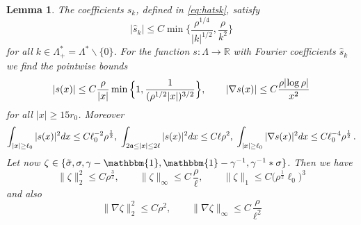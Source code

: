 \documentclass[a4paper,11pt]{article}
\def\bR{\mathbb{R}}
\let\io=\infty
\newtheorem{lemma}[theorem]{Lemma}
\numberwithin{equation}{section}
\begin{document}
\begin{lemma} \label{lm:eta}
The coefficients $\widehat{s}_k$, defined in \eqref{eq:hatsk}, satisfy 
\begin{equation} \label{eq:sfourier} |\widehat{s}_k| \leq C \min \Big\{  \frac{\rho^{1/4}}{|k|^{1/2}} , \frac{\rho}{k^2} \Big\} \end{equation} 
for all $k \in \Lambda^*_+ = \Lambda^* \backslash \{ 0 \}$. For the function $s : \Lambda \to \bR$ with Fourier coefficients $\widehat{s}_k$ we find the pointwise bounds 
\begin{equation*} | s (x)| \leq C \frac{\rho}{|x|} \min \Big\{ 1 , \frac{1}{(\rho^{1/2} |x|)^{3/2}} \Big\} , \qquad |\nabla s (x)| \leq C \frac{\rho |\hspace{-.05cm} \log \rho |}{x^2} \end{equation*} 
for all $|x| \geq 15r_0$. Moreover 
\begin{equation}\label{eq:est-combi}
 \int_{|x|\geq \ell_0} |s(x)|^2 dx  \leq C\ell_0^{-2}\rho^{\frac{1}{2}}  , \;   \int_{2\frak{a} \leq |x|\leq  2\ell} 
 |s(x)|^2 dx  \leq C\ell\rho^{2}, \;  \int_{|x|\geq \ell_0} |\nabla s(x)|^2 dx  \leq  C\ell_0^{-4}\rho^{\frac{1}{2}}\, . \end{equation} 
%
Let now $\zeta\in \{\tilde\sigma, \sigma,\gamma-\mathbbm{1},\mathbbm{1} - \gamma^{-1} , \gamma^{-1}*\sigma\}$. Then we have 
\begin{equation} \label{eq:zeta-combi1} 
 \|\zeta\|^2_2 \leq C \rho^{\frac{3}{2}}, \qquad \| \zeta \|_\infty \leq C\, \frac{\rho}{\ell} , \qquad  \|\zeta\|_1  \leq C \big(\rho^{\frac{1}{2}}\ell_0\big)^3 
 \end{equation} 
 and also 
 \begin{equation}\label{eq:zeta-combi2}
   \|\nabla \zeta\|^2_2 \leq C \rho^{2} , \qquad  \|\nabla \zeta\|_\io  \leq C \, \frac{\rho}{\ell^2}
   \end{equation} 
%

\end{lemma}
\end{document}
